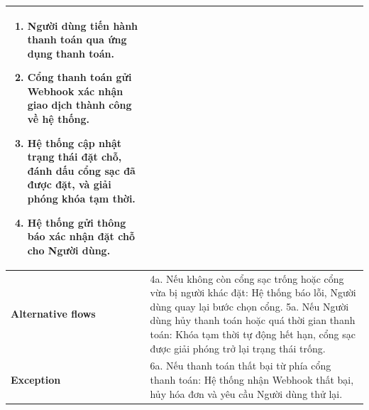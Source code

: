 \begin{itemize}
\begin{longtable}{|m{}|m{}|}
\begin{enumerate}[label=\arabic*.]
    \item Người dùng tiến hành thanh toán qua ứng dụng thanh toán.
    \item Cổng thanh toán gửi Webhook xác nhận giao dịch thành công về hệ thống.
    \item Hệ thống cập nhật trạng thái đặt chỗ, đánh dấu cổng sạc đã được đặt, và giải phóng khóa tạm thời.
    \item Hệ thống gửi thông báo xác nhận đặt chỗ cho Người dùng.
  \end{enumerate}\\
  \hline
  \textbf{Alternative flows} &
  4a. Nếu không còn cổng sạc trống hoặc cổng vừa bị người khác đặt: Hệ thống báo lỗi, Người dùng quay lại bước chọn cổng. \newline
  5a. Nếu Người dùng hủy thanh toán hoặc quá thời gian thanh toán: Khóa tạm thời tự động hết hạn, cổng sạc được giải phóng trở lại trạng thái trống.\\
  \hline
  \textbf{Exception} &
  6a. Nếu thanh toán thất bại từ phía cổng thanh toán: Hệ thống nhận Webhook thất bại, hủy hóa đơn và yêu cầu Người dùng thử lại.\\
  \hline
  \end{longtable}


\end{itemize}
